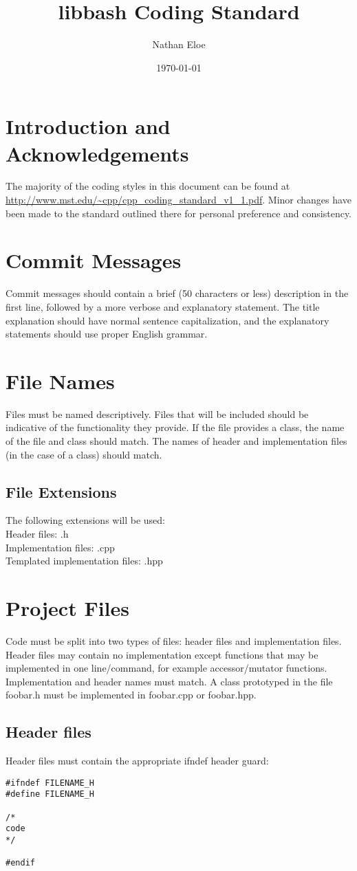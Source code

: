 \documentclass[letterpaper,10pt]{article}
\title{libbash Coding Standard}
\author{Nathan Eloe}
\date{\today}
\begin{document}
\maketitle
\section{Introduction and Acknowledgements}
The majority of the coding styles in this document can be found at \url{http://www.mst.edu/~cpp/cpp_coding_standard_v1_1.pdf}.  Minor changes have been made to the standard outlined there for personal preference and consistency.
\section{Commit Messages}
Commit messages should contain a brief (50 characters or less) description in the first line, followed by a more verbose and explanatory statement.  The title explanation should have normal sentence capitalization, and the explanatory statements should use proper English grammar.
\section{File Names}
Files must be named descriptively.  Files that will be included should be indicative of the functionality they provide.  If the file provides a class, the name of the file and class should match.  The names of header and implementation files (in the case of a class) should match.
\subsection{File Extensions}
The following extensions will be used:\\
Header files: .h\\
Implementation files: .cpp\\
Templated implementation files: .hpp
\section{Project Files}
Code must be split into two types of files: header files and implementation files.  Header files may contain no implementation except functions that may be implemented in one line/command, for example accessor/mutator functions.\\
Implementation and header names must match.  A class prototyped in the file foobar.h must be implemented in foobar.cpp or foobar.hpp.\\
\subsection{Header files}
Header files must contain the appropriate ifndef header guard:
\begin{verbatim}
#ifndef FILENAME_H
#define FILENAME_H

/*
code
*/

#endif
\end{verbatim}
\end{document}
